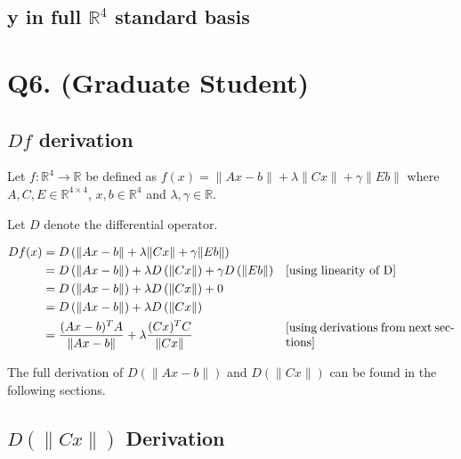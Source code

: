 \documentclass{article}
\begin{document}
    \subsection{y in full $\mathbb{R}^4$ standard basis}


    \section{Q6. (Graduate Student)}
    \subsection{ $Df$ derivation }
    Let $f: \mathbb{R}^4 \rightarrow \mathbb{R}$ be defined as $f(x) = \| Ax - b \| + \lambda \| Cx \| + \gamma \| Eb \|$ where $A, C, E \in \mathbb{R}^{4 \times 4}$, $x,b \in \mathbb{R}^4$ and $\lambda,\gamma \in \mathbb{R}$.

    Let $D$ denote the differential operator.

    \begin{align*}
    Df(x) &= D \left( \| Ax - b \| + \lambda \| Cx \| + \gamma \| Eb \| \right) &\\
    &= D \left( \| Ax - b \| \right) +  \lambda D \left( \| Cx \| \right) +  \gamma D \left( \| Eb \| \right) & \parbox[c]{0.4\linewidth}{[using linearity of D]}\\
    &= D \left( \| Ax - b \| \right) +  \lambda D \left( \| Cx \| \right) +  0 &\\
    &= D \left( \| Ax - b \| \right) +  \lambda D \left( \| Cx \| \right) &\\
    &= \frac{ (Ax-b)^T A }{\| Ax-b \| } + \lambda \frac{(Cx)^T C}{ \| Cx \| } & \parbox[c]{0.4\linewidth}{[using derivations from next sections]}
    \end{align*}

    The full derivation of $D \left( \| Ax - b \| \right)$ and $ D \left( \| Cx \| \right) $ can be found in the following sections.

    \subsection{ $D \left(\| Cx \| \right)$ Derivation }
\end{document}
